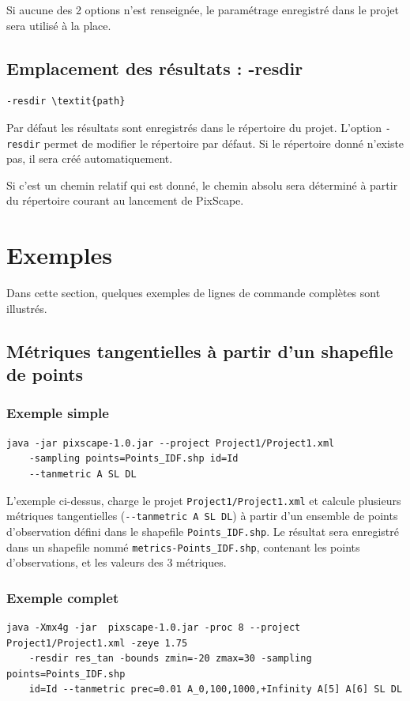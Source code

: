 \documentclass{report}
\begin{document}
Si aucune des 2 options n'est renseignée, le paramétrage enregistré dans le projet sera utilisé à la place.

\subsection{Emplacement des résultats : -resdir}
\begin{Verbatim}[commandchars=\\\{\}]
-resdir \textit{path}
\end{Verbatim}
Par défaut les résultats sont enregistrés dans le répertoire du projet. L'option \verb|-resdir| permet de modifier le répertoire par défaut. 
Si le répertoire donné n'existe pas, il sera créé automatiquement.

Si c'est un chemin relatif qui est donné, le chemin absolu sera déterminé à partir du répertoire courant au lancement de PixScape.

\section{Exemples}

Dans cette section, quelques exemples de lignes de commande complètes sont illustrés.

\subsection{Métriques tangentielles à partir d'un shapefile de points}
\subsubsection{Exemple simple}
\begin{Verbatim}
java -jar pixscape-1.0.jar --project Project1/Project1.xml 
	-sampling points=Points_IDF.shp id=Id 
	--tanmetric A SL DL
\end{Verbatim}

L'exemple ci-dessus, charge le projet \verb|Project1/Project1.xml| et calcule plusieurs métriques tangentielles (\verb|--tanmetric A SL DL|) à partir d'un ensemble de points d'observation défini dans le shapefile \verb|Points_IDF.shp|. Le résultat sera enregistré dans un shapefile nommé \verb|metrics-Points_IDF.shp|, contenant les points d'observations, et les valeurs des 3 métriques.

\subsubsection{Exemple complet}
\begin{Verbatim}
java -Xmx4g -jar  pixscape-1.0.jar -proc 8 --project Project1/Project1.xml -zeye 1.75
	-resdir res_tan -bounds zmin=-20 zmax=30 -sampling points=Points_IDF.shp 
	id=Id --tanmetric prec=0.01 A_0,100,1000,+Infinity A[5] A[6] SL DL
\end{Verbatim}
\end{document}
